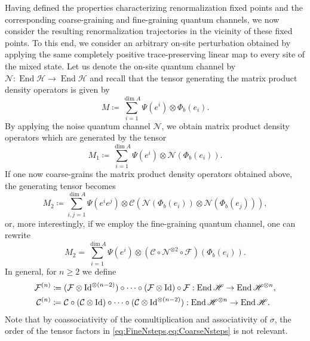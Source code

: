 \documentclass[a4paper,10pt]{amsart}
\newcommand{\Fine}{\mathcal{F}}
\newcommand{\Coarse}{\mathcal{C}}
\newcommand{\Noisy}{\mathcal{N}}
\theoremstyle{definition}
\begin{document}
Having defined the properties characterizing renormalization fixed points and the corresponding coarse-graining and fine-graining quantum channels, we now consider the resulting renormalization trajectories in the vicinity of these fixed points.
To this end, we consider an arbitrary on-site perturbation obtained by applying the same completely positive trace-preserving linear map to every site of the mixed state.
\smallbreak\noindent%
Let us denote the on-site quantum channel by $\Noisy:\operatorname{End}\mathscr{H}\to\operatorname{End}\mathscr{H}$ and recall that 
the tensor generating the matrix product density operators is given by
\[
    M
    \coloneqq
    \sum_{i=1}^{\dim A} \Psi(e^{i}) \otimes \Phi_b(e_i).
\]
By applying the noise quantum channel $\Noisy$, we obtain matrix product density operators which are generated by the tensor
\begin{equation}
\label{eq:defM1}
    M_1
    \coloneqq
    \sum_{i=1}^{\dim A} \Psi(e^{i}) \otimes \Noisy(\Phi_b(e_i)).
\end{equation}
If one now coarse-grains the matrix product density operators obtained above, the generating tensor becomes
\begin{equation}
    \label{eq:defM2}
    M_{2}
    \coloneqq
    \sum_{i,j=1}^{\dim A}
        \Psi(e^{i}e^{j}) \otimes \Coarse(\Noisy(\Phi_b(e_i))\otimes \Noisy(\Phi_b(e_j))),
\end{equation}
or, more interestingly, if we employ the fine-graining quantum channel, one can rewrite
\begin{equation}
    \label{eq:charM2}
    M_{2}
    =
    \sum_{i=1}^{\dim A}
        \Psi(e^i) \otimes (\Coarse\circ \Noisy^{\otimes 2}\circ \Fine)(\Phi_b(e_i)).
\end{equation}
In general, for $n\geq 2$ we define
\begin{align}
    \label{eq:FineNsteps}
    \Fine^{\smash{(n)}} &\coloneqq (\Fine\otimes \mathrm{Id}^{\otimes (n-2)})\circ \cdots\circ  (\Fine\otimes \mathrm{Id}) \circ \Fine:\operatorname{End}\mathscr{H}\to \operatorname{End}\mathscr{H}^{\otimes n},
\\
    \label{eq:CoarseNsteps}
    \Coarse^{\smash{(n)}} &\coloneqq \Coarse \circ (\Coarse\otimes\mathrm{Id}) \circ \cdots \circ (\Coarse\otimes \mathrm{Id}^{\otimes (n-2)}):\operatorname{End}\mathscr{H}^{\otimes n}\to \operatorname{End}\mathscr{H}.
\end{align}
Note that by coassociativity of the comultiplication and associativity of $\sigma$, the order of the tensor factors in \cref{eq:FineNsteps,eq:CoarseNsteps} is not relevant.
\end{document}

